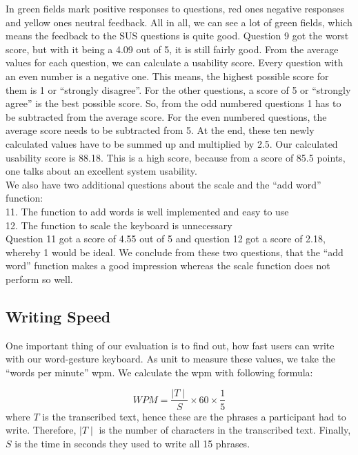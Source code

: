 In  green fields mark positive responses to questions, red ones negative responses and yellow ones neutral feedback. All in all, we can see a lot of green fields, which means the feedback to the SUS questions is quite good. Question 9 got the worst score, but with it being a 4.09 out of 5, it is still fairly good. From the average values for each question, we can calculate a usability score. Every question with an even number is a negative one. This means, the highest possible score for them is 1 or ``strongly disagree''. For the other questions, a score of 5 or ``strongly agree'' is the best possible score. So, from the odd numbered questions 1 has to be subtracted from the average score. For the even numbered questions, the average score needs to be subtracted from 5. At the end, these ten newly calculated values have to be summed up and multiplied by 2.5. Our calculated usability score is 88.18. This is a high score, because from a score of 85.5 points, one talks about an excellent system usability.\\
We also have two additional questions about the scale and the ``add word'' function:\\
11. The function to add words is well implemented and easy to use\\
12. The function to scale the keyboard is unnecessary\\
Question 11 got a score of 4.55 out of 5 and question 12 got a score of 2.18, whereby 1 would be ideal. We conclude from these two questions, that the ``add word'' function makes a good impression whereas the scale function does not perform so well.\\

\subsection{Writing Speed}
One important thing of our evaluation is to find out, how fast users can write with our word-gesture keyboard. As unit to measure these values, we take the ``words per minute'' wpm. We calculate the wpm with following formula: 

\begin{equation}
    WPM = \frac{\mid T \mid}{S} \times 60 \times \frac{1}{5}
\end{equation}
where $T$ is the transcribed text, hence these are the phrases a participant had to write. Therefore, $\mid T \mid$ is the number of characters in the transcribed text. Finally, $S$ is the time in seconds they used to write all 15 phrases.\\

